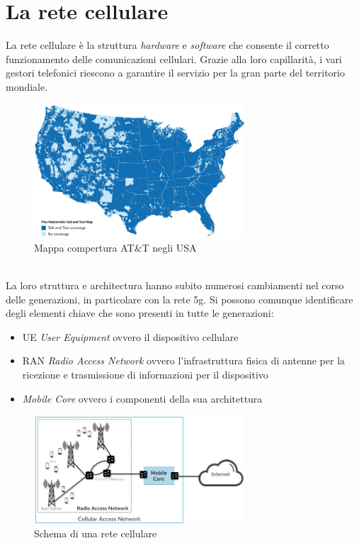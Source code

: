 \chapter{La rete cellulare}
La rete cellulare è la struttura \textit{hardware} e \textit{software} che consente il corretto
funzionamento delle comunicazioni cellulari.
Grazie alla loro capillarità, i vari gestori telefonici riescono a garantire il servizio per la 
gran parte del territorio mondiale.
\begin{figure}[h]
    \centering
    \includegraphics[width=0.7\textwidth]{images/att-coverage.png}
    \caption{Mappa compertura AT\&T negli USA}
\end{figure}\\
La loro struttura e architectura hanno subito numerosi cambiamenti nel corso delle generazioni, in particolare con la rete
5g. Si possono comunque identificare degli elementi chiave che sono presenti in tutte le generazioni:
\begin{itemize}
    \item UE \textit{User Equipment} ovvero il dispositivo cellulare
    \item RAN \textit{Radio Access Network} ovvero l'infrastruttura fisica di antenne per la ricezione e trasmissione di informazioni per il dispositivo
    \item \textit{Mobile Core} ovvero i componenti della sua architettura
\end{itemize}
\begin{figure}[h]
    \centering
    \includegraphics[width=0.7\textwidth]{images/cellular-network-basic-scheme.png}
    \caption{Schema di una rete cellulare}
\end{figure}

